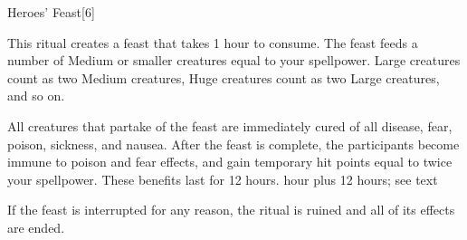 \begin{spellsection}{Heroes' Feast}[6]
    \begin{spellheader}
    \end{spellheader}
    \begin{spellcontent}
        \begin{spelltargetinginfo}
        \end{spelltargetinginfo}
        \begin{spelleffects}
            \spelleffect This ritual creates a feast that takes 1 hour to consume. The feast feeds a number of Medium or smaller creatures equal to your spellpower. Large creatures count as two Medium creatures, Huge creatures count as two Large creatures, and so on.

            All creatures that partake of the feast are immediately cured of all disease, fear, poison, sickness, and nausea. After the feast is complete, the participants become immune to poison and fear effects, and gain temporary hit points equal to twice your spellpower. These benefits last for 12 hours.
             hour plus 12 hours; see text
        \end{spelleffects}
    \end{spellcontent}
    \begin{spellfooter}
        \spellnotes If the feast is interrupted for any reason, the ritual is ruined and all of its effects are ended.
    \end{spellfooter}
\end{spellsection}

